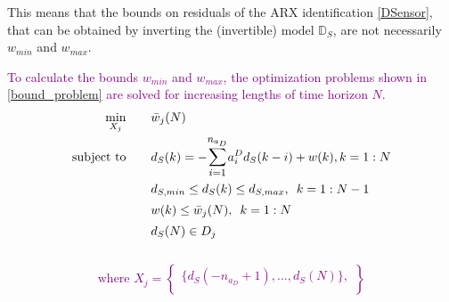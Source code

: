 \documentclass[letterpaper, 10 pt, conference]{ieeeconf}  %
\newcommand{\notimplies}{%
	\mathrel{{\ooalign{\hidewidth$\not\phantom{=}$\hidewidth\cr$\implies$}}}}
\begin{document}
	This means that the bounds on residuals of the ARX identification \eqref{DSensor}, that can be obtained by inverting the (invertible) model $\mathbb{D}_S$, are not necessarily $w_{min}$ and $w_{max}$. 
		
	\textcolor{purple}{To calculate the bounds $w_{min}$ and $w_{max}$, the optimization problems shown in \eqref{bound_problem} are solved for increasing lengths of time horizon $N$.
	\begin{equation}
	\label{bound_problem}
	\begin{matrix}
	\begin{aligned}
	\underset{X_{j}}{\text{min}}
	 & \hspace{20pt} \bar{w}_j(N) \\
	\text{subject to} 
	 & \hspace{20pt}
	d_S(k) = -\mathlarger{\sum\limits_{i=1}^{n_{a_D}}}a_i^Dd_S(k-i) + w(k), k={1:N}\\
	 & \hspace{20pt}  d_{S,min} \leq d_S(k) \leq d_{S,max}, \hspace{5pt} k={1:N-1} \vspace{0pt}\\
	 & \hspace{20pt}   w(k) \leq \bar{w}_j(N), \hspace{5pt} k={1:N} \vspace{0pt}\\
	 & \hspace{20pt}  d_S(N) \in D_j 
	 \end{aligned}
	\vspace{10pt} 
	\end{matrix}
	\end{equation}
	\vspace{-10pt}
	\begin{equation*}
	\begin{matrix}
	\text{where } X_j = 
	\begin{Bmatrix}
	\{d_S(-n_{a_D}+1),...,d_S(N)\},\\

\end{Bmatrix}
\end{matrix}
\end{equation*}}
\end{document}
